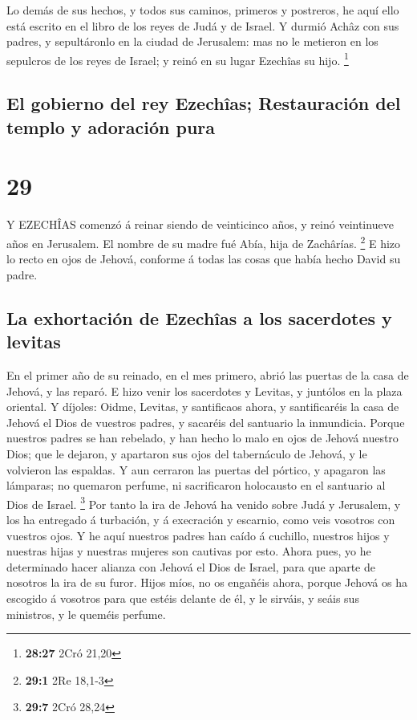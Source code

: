  Lo demás de sus hechos, y todos sus caminos, primeros y
postreros, he aquí ello está escrito en el libro de los reyes de Judá y
de Israel.  Y durmió Achâz con sus padres, y sepultáronlo
en la ciudad de Jerusalem: mas no le metieron en los sepulcros de los
reyes de Israel; y reinó en su lugar Ezechîas su hijo. \footnote{\textbf{28:27}
  2Cró 21,20}

\hypertarget{el-gobierno-del-rey-ezechuxeeas-restauraciuxf3n-del-templo-y-adoraciuxf3n-pura}{%
\subsection{El gobierno del rey Ezechîas; Restauración del templo y
adoración
pura}\label{el-gobierno-del-rey-ezechuxeeas-restauraciuxf3n-del-templo-y-adoraciuxf3n-pura}}

\hypertarget{section-28}{%
\section{29}\label{section-28}}

 Y EZECHÎAS comenzó á reinar siendo de veinticinco años, y
reinó veintinueve años en Jerusalem. El nombre de su madre fué Abía,
hija de Zachârías. \footnote{\textbf{29:1} 2Re 18,1-3}  E
hizo lo recto en ojos de Jehová, conforme á todas las cosas que había
hecho David su padre.

\hypertarget{la-exhortaciuxf3n-de-ezechuxeeas-a-los-sacerdotes-y-levitas}{%
\subsection{La exhortación de Ezechîas a los sacerdotes y
levitas}\label{la-exhortaciuxf3n-de-ezechuxeeas-a-los-sacerdotes-y-levitas}}

 En el primer año de su reinado, en el mes primero, abrió
las puertas de la casa de Jehová, y las reparó.  E hizo
venir los sacerdotes y Levitas, y juntólos en la plaza oriental.
 Y díjoles: Oidme, Levitas, y santificaos ahora, y
santificaréis la casa de Jehová el Dios de vuestros padres, y sacaréis
del santuario la inmundicia.  Porque nuestros padres se han
rebelado, y han hecho lo malo en ojos de Jehová nuestro Dios; que le
dejaron, y apartaron sus ojos del tabernáculo de Jehová, y le volvieron
las espaldas.  Y aun cerraron las puertas del pórtico, y
apagaron las lámparas; no quemaron perfume, ni sacrificaron holocausto
en el santuario al Dios de Israel. \footnote{\textbf{29:7} 2Cró 28,24}
 Por tanto la ira de Jehová ha venido sobre Judá y
Jerusalem, y los ha entregado á turbación, y á execración y escarnio,
como veis vosotros con vuestros ojos.  Y he aquí nuestros
padres han caído á cuchillo, nuestros hijos y nuestras hijas y nuestras
mujeres son cautivas por esto.  Ahora pues, yo he
determinado hacer alianza con Jehová el Dios de Israel, para que aparte
de nosotros la ira de su furor.  Hijos míos, no os engañéis
ahora, porque Jehová os ha escogido á vosotros para que estéis delante
de él, y le sirváis, y seáis sus ministros, y le queméis perfume.

